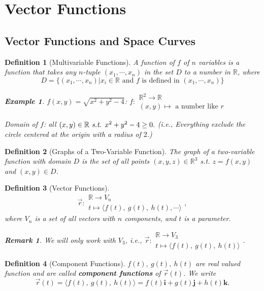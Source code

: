 \documentclass[12pt,a4paper]{article}
\newtheorem{df}{Definition}[subsection]
\newtheorem{eg}{Example}[subsection]
\newtheorem*{rmk}{\indent Remark}
\def\R{{\mathbb{R}}}
\def\vecr{\vec{r}}
\def\veci{\boldsymbol{\textbf{i}}}
\def\vecj{\boldsymbol{\textbf{j}}}
\def\veck{\boldsymbol{\textbf{k}}}
\begin{document}
\newpage
\section{Vector Functions}
\subsection{Vector Functions and Space Curves}
\begin{df}[Multivariable Functions]
	A function of $f$ of $n$ variables is a function that takes any $n$-tuple $(x_1,\cdots,x_n)$ in the set $D$ to a number in $\R$, where \[D=\bigg\{(x_1,\cdots,x_n)|x_i\in\R\text{ and }f\text{ is defined in }(x_1,\cdots,x_n)\bigg\}\]	
	\begin{eg}
		$f(x,y)=\sqrt{x^2+y^2-4}$: $f:\begin{array}{l}\R^2\longrightarrow\R\\ (x,y)\longmapsto\text{ a number like }r\end{array}$	
		
		Domain of $f$: all $(x,y)\in\R\emph{ s.t. }x^2+y^2-4\geq0.$ (i.e., Everything exclude the circle centered at the origin with a radius of $2$.)
	\end{eg}
\end{df}
\begin{df}[Graphs of a Two-Variable Function]
	The graph of a two-variable function with domain $D$ is the set of all points $(x,y,z)\in\R^3$ \emph{s.t.} $z=f(x,y)$ and $(x,y)\in D$.	
\end{df}
\begin{df}[Vector Functions]
	\[\vecr:\begin{array}{l}\R\longrightarrow V_n\\ t\longmapsto\langle f(t),\ g(t),\ h(t),\cdots\rangle\end{array}, \] where $V_n$ is a set of all vectors with $n$ components, and $t$ is a parameter. 
	\begin{rmk}
		We will only work with $V_3$, i.e., 	$\vecr:\begin{array}{l}\R\longrightarrow V_3\\ t\longmapsto\langle f(t),\ g(t),\ h(t)\rangle\end{array}$.
	\end{rmk}
\end{df}
\begin{df}[Component Functions]
	$f(t),\ g(t),\ h(t)$ are real valued function and are called \textbf{component functions} of $\vecr(t)$. We write \[\vecr(t)=\langle f(t),\ g(t),\ h(t)\rangle=f(t)\veci+g(t)\vecj+h(t)\veck.\]		
\end{df}
\end{document}
